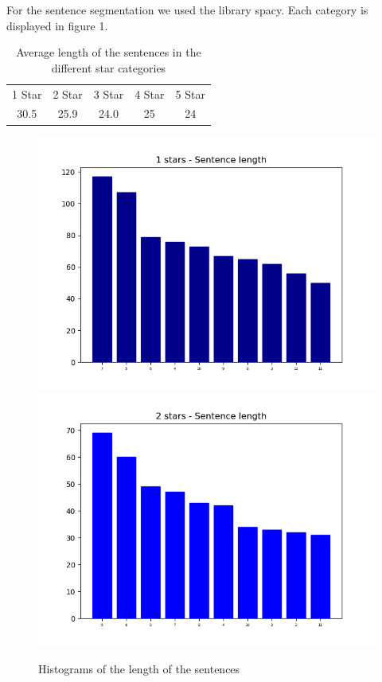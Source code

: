 For the sentence segmentation we used the library spacy. Each category is displayed in figure 1.
	\begin{center}
		\begin{table}[!h]
			\caption{Average length of the sentences in the different star categories}
			\begin{tabular}{ c c c c c}
				1 Star & 2 Star & 3 Star  & 4 Star & 5 Star\\
				30.5 & 25.9 & 24.0  & 25 & 24\\
			\end{tabular}
		\end{table}
	\end{center}
	
	\begin{figure}
		\caption{Histograms of the length of the sentences}
		\includegraphics[scale=0.3]{figures/1stars-Sentencelength.png}
		\includegraphics[scale=0.3]{figures/2stars-Sentencelength.png}

\end{figure}
